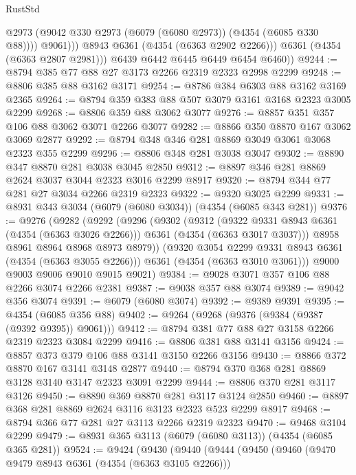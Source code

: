 \begin{lexlean}{RustStd}
\begin{coremodule}
                    @2973
                    (@9042 @330 @2973 (@6079 (@6080 @2973)) (@4354 (@6085 @330 @88))))
                  @9061)))
            @8943
            @6361
            (@4354 (@6363 @2902 @2266)))
          @6361
          (@4354 (@6363 @2807 @2981)))
        @6439
        @6442
        @6445
        @6449
        @6454
        @6460))
@9244 := @8794 @385 @77 @88 @27 @3173 @2266 @2319 @2323 @2998 @2299
@9248 := @8806 @385 @88 @3162 @3171
@9254 := @8786 @384 @6303 @88 @3162 @3169 @2365
@9264 := @8794 @359 @383 @88 @507 @3079 @3161 @3168 @2323 @3005 @2299
@9268 := @8806 @359 @88 @3062 @3077
@9276 := @8857 @351 @357 @106 @88 @3062 @3071 @2266 @3077
@9282 := @8866 @350 @8870 @167 @3062 @3069 @2877
@9292 := @8794 @348 @346 @281 @8869 @3049 @3061 @3068 @2323 @355 @2299
@9296 := @8806 @348 @281 @3038 @3047
@9302 := @8890 @347 @8870 @281 @3038 @3045 @2850
@9312 := @8897 @346 @281 @8869 @2624 @3037 @3044 @2323 @3016 @2299 @8917
@9320 := @8794 @344 @77 @281 @27 @3034 @2266 @2319 @2323
@9322 := @9320 @3025 @2299
@9331 := @8931 @343 @3034 (@6079 (@6080 @3034)) (@4354 (@6085 @343 @281))
@9376 := @9276
    (@9282
      (@9292
        (@9296
          (@9302
            (@9312
              (@9322 @9331 @8943 @6361 (@4354 (@6363 @3026 @2266)))
              @6361
              (@4354 (@6363 @3017 @3037)))
            @8958
            @8961
            @8964
            @8968
            @8973
            @8979))
        (@9320 @3054 @2299 @9331 @8943 @6361 (@4354 (@6363 @3055 @2266)))
        @6361
        (@4354 (@6363 @3010 @3061)))
      @9000
      @9003
      @9006
      @9010
      @9015
      @9021)
@9384 := @9028 @3071 @357 @106 @88 @2266 @3074 @2266 @2381
@9387 := @9038 @357 @88 @3074
@9389 := @9042 @356 @3074
@9391 := @6079 (@6080 @3074)
@9392 := @9389 @9391
@9395 := @4354 (@6085 @356 @88)
@9402 := @9264 (@9268 (@9376 (@9384 (@9387 (@9392 @9395)) @9061)))
@9412 := @8794 @381 @77 @88 @27 @3158 @2266 @2319 @2323 @3084 @2299
@9416 := @8806 @381 @88 @3141 @3156
@9424 := @8857 @373 @379 @106 @88 @3141 @3150 @2266 @3156
@9430 := @8866 @372 @8870 @167 @3141 @3148 @2877
@9440 := @8794 @370 @368 @281 @8869 @3128 @3140 @3147 @2323 @3091 @2299
@9444 := @8806 @370 @281 @3117 @3126
@9450 := @8890 @369 @8870 @281 @3117 @3124 @2850
@9460 := @8897 @368 @281 @8869 @2624 @3116 @3123 @2323 @523 @2299 @8917
@9468 := @8794 @366 @77 @281 @27 @3113 @2266 @2319 @2323
@9470 := @9468 @3104 @2299
@9479 := @8931 @365 @3113 (@6079 (@6080 @3113)) (@4354 (@6085 @365 @281))
@9524 := @9424
    (@9430
      (@9440
        (@9444
          (@9450
            (@9460
              (@9470 @9479 @8943 @6361 (@4354 (@6363 @3105 @2266)))

\end{coremodule}
\end{lexlean}
